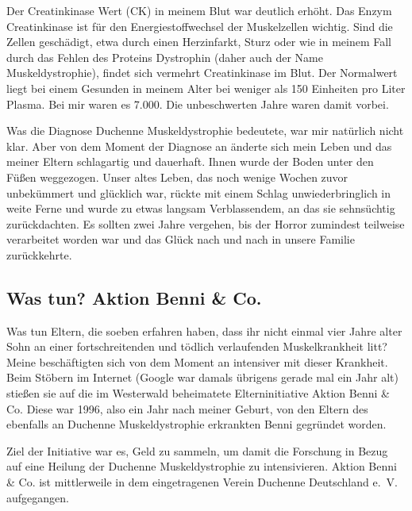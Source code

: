 \documentclass[fontsize=14pt,a4paper,headinclude,DIV=calc,automark]{scrbook}
\begin{document}
Der Creatinkinase Wert (CK) in meinem Blut war deutlich erhöht. Das Enzym Creatinkinase ist für den Energiestoffwechsel der Muskelzellen wichtig. Sind die Zellen geschädigt, etwa durch einen Herzinfarkt, Sturz oder wie in meinem Fall durch das Fehlen des Proteins Dystrophin (daher auch der Name Muskeldystrophie), findet sich vermehrt Creatinkinase im Blut. Der Normalwert liegt bei einem Gesunden in meinem Alter bei weniger als 150 Einheiten pro Liter Plasma. Bei mir waren es 7.000. Die unbeschwerten Jahre waren damit vorbei.

Was die Diagnose Duchenne Muskeldystrophie bedeutete, war mir natürlich nicht klar. Aber von dem Moment der Diagnose an änderte sich mein Leben und das meiner Eltern schlagartig und dauerhaft. Ihnen wurde der Boden unter den Füßen weggezogen. Unser altes Leben, das noch wenige Wochen zuvor unbekümmert und glücklich war, rückte mit einem Schlag unwiederbringlich in weite Ferne und wurde zu etwas langsam Verblassendem, an das sie sehnsüchtig zurückdachten. Es sollten zwei Jahre vergehen, bis der Horror zumindest teilweise verarbeitet worden war und das Glück nach und nach in unsere Familie zurückkehrte.

\subsection{Was tun? Aktion Benni \& Co.}

Was tun Eltern, die soeben erfahren haben, dass ihr nicht einmal vier Jahre alter Sohn an einer fortschreitenden und tödlich verlaufenden Muskelkrankheit litt? Meine beschäftigten sich von dem Moment an intensiver mit dieser Krankheit. Beim Stöbern im Internet (Google war damals übrigens gerade mal ein Jahr alt) stießen sie auf die im Westerwald beheimatete Elterninitiative Aktion Benni \& Co. Diese war 1996, also ein Jahr nach meiner Geburt, von den Eltern des ebenfalls an Duchenne Muskeldystrophie erkrankten Benni gegründet worden.

Ziel der Initiative war es, Geld zu sammeln, um damit die Forschung in Bezug auf eine Heilung der Duchenne Muskeldystrophie zu intensivieren. Aktion Benni \& Co. ist mittlerweile in dem eingetragenen Verein Duchenne Deutschland e.~V. aufgegangen.
\end{document}
